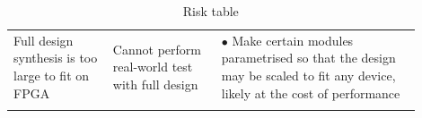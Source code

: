 \documentclass{article}
\begin{document}
\begin{longtable}{R{0.22\linewidth} R{0.24\linewidth} R{0.44\linewidth}}
         Full design synthesis is too large to fit on FPGA & Cannot perform real-world test with full design & $\bullet$ Make certain modules parametrised so that the design may be scaled to fit any device, likely at the cost of performance \vspace{5pt} \\
    \caption{Risk table}
    \label{tab:risk_table}
\end{longtable}

\FloatBarrier



\end{document}
